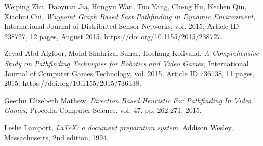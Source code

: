 \documentclass[a4paper]{article}
\begin{document}
\newpage
\begin{thebibliography}{9}

  Weiping Zhu, Daoyuan Jia, Hongyu Wan, Tuo Yang, Cheng Hu, Kechen Qin, Xiaohui Cui,
  \textit{Waypoint Graph Based Fast Pathfinding in Dynamic Environment},
  International Journal of Distributed Sensor Networks, vol. 2015, Article ID 238727, 12 pages,
  August 2015. https://doi.org/10.1155/2015/238727.

  Zeyad Abd Algfoor, Mohd Shahrizal Sunar, Hoshang Kolivand,
  \textit{A Comprehensive Study on Pathfinding Techniques for Robotics and Video Games},
  International Journal of Computer Games Technology, vol. 2015, Article ID 736138, 11 pages,
  2015. https://doi.org/10.1155/2015/736138.

  Geethu Elizebeth Mathew,
  \textit{Direction Based Heuristic For Pathfinding In Video Games},
  Procedia Computer Science, vol. 47, pp. 262-271,
  2015.

  Leslie Lamport,
  \textit{\LaTeX: a document preparation system},
  Addison Wesley, Massachusetts,
  2nd edition,
  1994.

\end{thebibliography}
\end{document}
